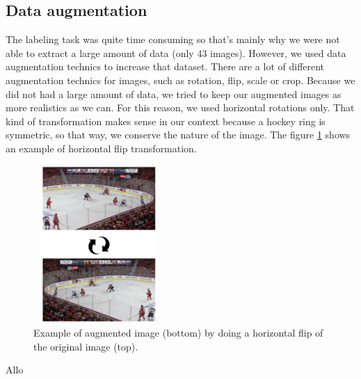 \subsection{Data augmentation}
The labeling task was quite time consuming so that's mainly why we were not able to extract a large amount of data (only 43 images). However, we used data augmentation technics to increase that dataset. There are a lot of different augmentation technics for images, such as rotation, flip, scale or crop. Because we did not had a large amount of data, we tried to keep our augmented images as more realistics as we can. For this reason, we used horizontal rotations only. That kind of transformation makes sense in our context because a hockey ring is symmetric, so that way, we conserve the nature of the image. The figure \ref{fig:rotation} shows an example of horizontal flip transformation.

\begin{figure}[H]
	\centering
	\includegraphics[width=5cm, height=6cm]{figures/rotation-example.png}
	\caption{Example of augmented image (bottom) by doing a horizontal flip of the original image (top).}
	\label{fig:rotation}
\end{figure}

Allo